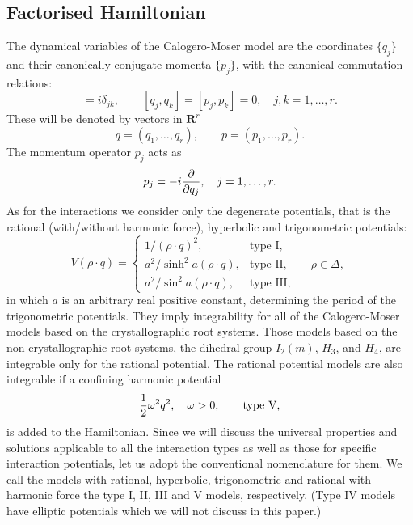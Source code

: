 \documentclass[a4paper,12pt]{article}
\begin{document}
\subsection{Factorised Hamiltonian}
The dynamical variables of the Calogero-Moser model are the coordinates
\(\{q_{j}\}\) and their canonically conjugate momenta \(\{p_{j}\}\), with
the canonical commutation relations:
\begin{equation}
   [q_{j},p_{k}]=i\delta_{jk},\qquad [q_{j},q_{k}]=
   [p_{j},p_{k}]=0,\quad j,k=1,\ldots,r.
\end{equation}
These will be denoted by vectors in \(\mathbf{R}^{r}\)
\begin{equation}
   q=(q_{1},\ldots,q_{r}),\qquad p=(p_{1},\ldots,p_{r}).
\end{equation}
The momentum operator \(p_j\) acts as
\[
   p_j=-i{\partial\over{\partial q_j}}, \quad j=1,\ldots,r.
\]
As for the interactions we consider only the degenerate potentials,
that is the rational (with/without
harmonic force), hyperbolic and trigonometric potentials:
\begin{equation}
   V(\rho\cdot q)=
   \left\{\begin{array}{rll}
   {1/{(\rho\cdot q)^2}},& \mbox{type I},&\\
   {a^2/{\sinh^2 a(\rho\cdot q)}}, &\mbox{type II},&\quad \rho\in\Delta,\\
   {a^2/{\sin^2 a(\rho\cdot q)}},&\mbox{type III},&
   \end{array}
   \right.
   \label{potfun}
\end{equation}
in which \(a\) is an arbitrary real positive constant, determining the
period of the trigonometric potentials.
They imply integrability for all of the
Calogero-Moser models based on the crystallographic root systems.
Those models based on the non-crystallographic root systems, the dihedral
group
\(I_2(m)\), \(H_3\), and \(H_4\), are integrable only for  the
rational potential.
The rational potential models are also integrable if a confining
harmonic
potential
\begin{equation}
   {1\over2}\omega^2q^2,\quad \omega>0,\qquad \mbox{type V},
   \label{harmpot}
\end{equation}
is added to the Hamiltonian.
Since we will discuss the universal properties and solutions applicable
to all the interaction types as well as those for specific interaction
potentials, let us adopt the conventional nomenclature for them.
We call the models with rational, hyperbolic, trigonometric and
rational with harmonic force the type I, II, III and V models, respectively.
(Type IV models have elliptic potentials
which we will not discuss in this paper.)
\end{document}
